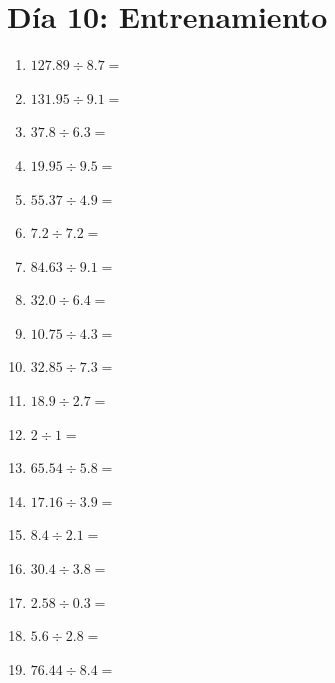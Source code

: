 \documentclass[12pt]{article}
\begin{document}
\section*{Día 10: Entrenamiento}
\begin{enumerate}
\item \large $ 127.89 \div 8.7 = $ \vspace{1.5cm}
\item \large $ 131.95 \div 9.1 = $ \vspace{1.5cm}
\item \large $ 37.8 \div 6.3 = $ \vspace{1.5cm}
\item \large $ 19.95 \div 9.5 = $ \vspace{1.5cm}
\item \large $ 55.37 \div 4.9 = $ \vspace{1.5cm}
\item \large $ 7.2 \div 7.2 = $ \vspace{1.5cm}
\item \large $ 84.63 \div 9.1 = $ \vspace{1.5cm}
\item \large $ 32.0 \div 6.4 = $ \vspace{1.5cm}
\item \large $ 10.75 \div 4.3 = $ \vspace{1.5cm}
\item \large $ 32.85 \div 7.3 = $ \vspace{1.5cm}
\newpage
\item \large $ 18.9 \div 2.7 = $ \vspace{1.5cm}
\item \large $ 2 \div 1 = $ \vspace{1.5cm}
\item \large $ 65.54 \div 5.8 = $ \vspace{1.5cm}
\item \large $ 17.16 \div 3.9 = $ \vspace{1.5cm}
\item \large $ 8.4 \div 2.1 = $ \vspace{1.5cm}
\item \large $ 30.4 \div 3.8 = $ \vspace{1.5cm}
\item \large $ 2.58 \div 0.3 = $ \vspace{1.5cm}
\item \large $ 5.6 \div 2.8 = $ \vspace{1.5cm}
\item \large $ 76.44 \div 8.4 = $ \vspace{1.5cm}

\end{enumerate}
\end{document}
